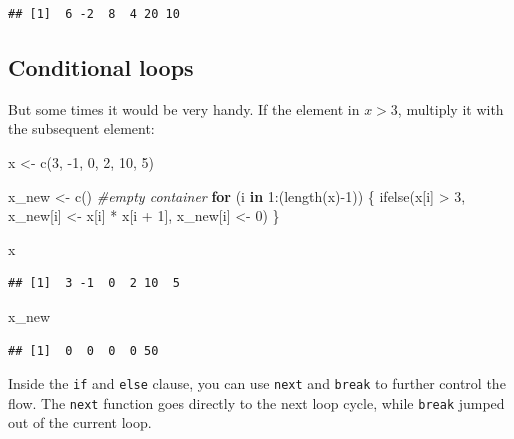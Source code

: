 \documentclass[
]{book}
\newenvironment{Shaded}{\begin{snugshade}}{\end{snugshade}}
\newcommand{\CommentTok}[1]{\textcolor[rgb]{0.56,0.35,0.01}{\textit{#1}}}
\newcommand{\ControlFlowTok}[1]{\textcolor[rgb]{0.13,0.29,0.53}{\textbf{#1}}}
\newcommand{\DecValTok}[1]{\textcolor[rgb]{0.00,0.00,0.81}{#1}}
\newcommand{\FunctionTok}[1]{\textcolor[rgb]{0.00,0.00,0.00}{#1}}
\newcommand{\NormalTok}[1]{#1}
\newcommand{\OtherTok}[1]{\textcolor[rgb]{0.56,0.35,0.01}{#1}}
\newcommand{\SpecialCharTok}[1]{\textcolor[rgb]{0.00,0.00,0.00}{#1}}
\begin{document}
\begin{verbatim}
## [1]  6 -2  8  4 20 10
\end{verbatim}

\hypertarget{conditional-loops}{%
\subsection{Conditional loops}\label{conditional-loops}}

But some times it would be very handy. If the element in \(x > 3\), multiply it with the subsequent element:

\begin{Shaded}
\begin{Highlighting}[]
\NormalTok{x }\OtherTok{\textless{}{-}} \FunctionTok{c}\NormalTok{(}\DecValTok{3}\NormalTok{, }\SpecialCharTok{{-}}\DecValTok{1}\NormalTok{, }\DecValTok{0}\NormalTok{, }\DecValTok{2}\NormalTok{, }\DecValTok{10}\NormalTok{, }\DecValTok{5}\NormalTok{)}

\NormalTok{x\_new }\OtherTok{\textless{}{-}} \FunctionTok{c}\NormalTok{() }\CommentTok{\#empty container}
\ControlFlowTok{for}\NormalTok{ (i }\ControlFlowTok{in} \DecValTok{1}\SpecialCharTok{:}\NormalTok{(}\FunctionTok{length}\NormalTok{(x)}\SpecialCharTok{{-}}\DecValTok{1}\NormalTok{)) \{}
  \FunctionTok{ifelse}\NormalTok{(x[i] }\SpecialCharTok{\textgreater{}} \DecValTok{3}\NormalTok{,  x\_new[i] }\OtherTok{\textless{}{-}}\NormalTok{ x[i] }\SpecialCharTok{*}\NormalTok{ x[i }\SpecialCharTok{+} \DecValTok{1}\NormalTok{], x\_new[i] }\OtherTok{\textless{}{-}} \DecValTok{0}\NormalTok{)  }
\NormalTok{\}}

\NormalTok{x}
\end{Highlighting}
\end{Shaded}

\begin{verbatim}
## [1]  3 -1  0  2 10  5
\end{verbatim}

\begin{Shaded}
\begin{Highlighting}[]
\NormalTok{x\_new}
\end{Highlighting}
\end{Shaded}

\begin{verbatim}
## [1]  0  0  0  0 50
\end{verbatim}

Inside the \texttt{if} and \texttt{else} clause, you can use \texttt{next} and \texttt{break} to further control the flow. The \texttt{next} function goes directly to the next loop cycle, while \texttt{break} jumped out of the current loop.
\end{document}
